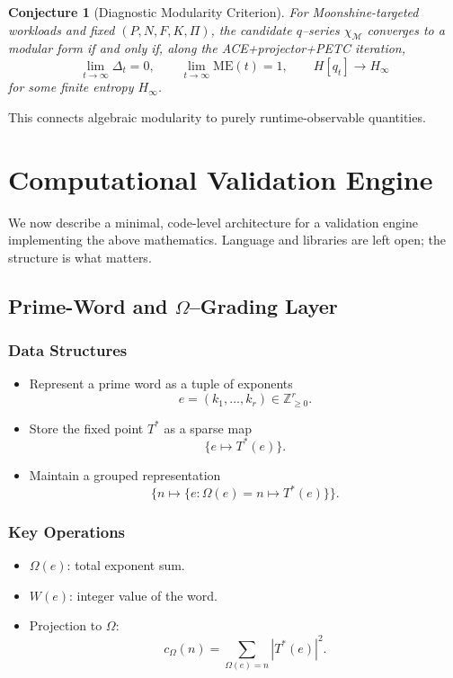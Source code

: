 \documentclass[11pt]{article}
\theoremstyle{definition}
\theoremstyle{plain}
\newtheorem{conjecture}[definition]{Conjecture}
\theoremstyle{remark}
\newcommand{\Mcal}{\mathcal{M}}
\newcommand{\Zbb}{\mathbb{Z}}
\newcommand{\OmegaVal}{\Omega}
\begin{document}
\begin{conjecture}[Diagnostic Modularity Criterion]
For Moonshine-targeted workloads and fixed $(P,N,F,K,\Pi)$, the candidate $q$--series $\chi_{\Mcal}$ converges to a modular form if and only if, along the ACE+projector+PETC iteration,
\[
  \lim_{t\to\infty} \Delta_t = 0,\qquad
  \lim_{t\to\infty} \mathrm{ME}(t) = 1,\qquad
  H[q_t] \to H_\infty
\]
for some finite entropy $H_\infty$.
\end{conjecture}

This connects algebraic modularity to purely runtime-observable quantities.

\section{Computational Validation Engine}

We now describe a minimal, code-level architecture for a validation engine implementing the above mathematics.
Language and libraries are left open; the structure is what matters.

\subsection{Prime-Word and $\OmegaVal$–Grading Layer}

\subsubsection*{Data Structures}

\begin{itemize}[leftmargin=1.5em]
  \item Represent a prime word as a tuple of exponents
  \[
    e = (k_1,\dotsc,k_r) \in \Zbb_{\ge 0}^r.
  \]
  \item Store the fixed point $T^*$ as a sparse map
  \[
    \{e \mapsto T^*(e)\}.
  \]
  \item Maintain a grouped representation
  \[
    \{ n \mapsto \{ e : \OmegaVal(e)=n \mapsto T^*(e) \}\}.
  \]
\end{itemize}

\subsubsection*{Key Operations}

\begin{itemize}[leftmargin=1.5em]
  \item $\OmegaVal(e)$: total exponent sum.
  \item $W(e)$: integer value of the word.
  \item Projection to $\OmegaVal$:
  \[
    c_\Omega(n) = \sum_{\OmegaVal(e)=n} |T^*(e)|^2.
  \]
\end{itemize}
\end{document}
